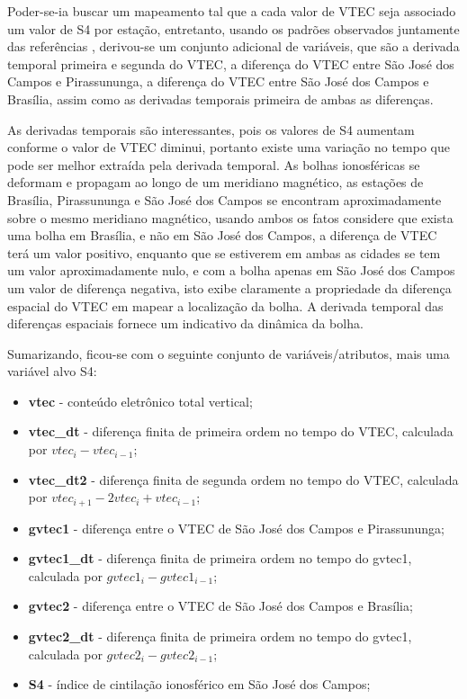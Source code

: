 Poder-se-ia buscar um mapeamento tal que a cada valor de VTEC seja associado um valor de S4 por estação, entretanto, usando os padrões observados juntamente das referências \cite{}, derivou-se um conjunto adicional de variáveis, que são a derivada temporal primeira e segunda do VTEC, a diferença do VTEC entre São José dos Campos e Pirassununga, a diferença do VTEC entre São José dos Campos e Brasília, assim como as derivadas temporais primeira de ambas as diferenças. 

As derivadas temporais são interessantes, pois os valores de S4 aumentam conforme o valor de VTEC diminui, portanto existe uma variação no tempo que pode ser melhor extraída pela derivada temporal. As bolhas ionosféricas se deformam e propagam ao longo de um meridiano magnético, as estações de Brasília, Pirassununga e São José dos Campos se encontram aproximadamente sobre o mesmo meridiano magnético, usando ambos os fatos considere que exista uma bolha em Brasília, e não em São José dos Campos, a diferença de VTEC terá um valor positivo, enquanto que se estiverem em ambas as cidades se tem um valor aproximadamente nulo, e com a bolha apenas em São José dos Campos um valor de diferença negativa, isto exibe claramente a propriedade da diferença espacial do VTEC em mapear a localização da bolha. A derivada temporal das diferenças espaciais fornece um indicativo da dinâmica da bolha.

Sumarizando, ficou-se com o seguinte conjunto de variáveis/atributos, mais uma variável alvo S4:

\begin{itemize}
\item {\bf vtec} - conteúdo eletrônico total vertical;
\item {\bf vtec\_dt} - diferença finita de primeira ordem no tempo do VTEC, calculada por $vtec_i-vtec_{i-1}$;
\item {\bf vtec\_dt2} - diferença finita de segunda ordem no tempo do VTEC, calculada por $vtec_{i+1}-2vtec_i+vtec_{i-1}$;
\item {\bf gvtec1} - diferença entre o VTEC de São José dos Campos e Pirassununga;
\item {\bf gvtec1\_dt} - diferença finita de primeira ordem no tempo do gvtec1, calculada por $gvtec1_i-gvtec1_{i-1}$;
\item {\bf gvtec2} - diferença entre o VTEC de São José dos Campos e Brasília;
\item {\bf gvtec2\_dt} - diferença finita de primeira ordem no tempo do gvtec1, calculada por $gvtec2_i-gvtec2_{i-1}$;
\item {\bf S4} - índice de cintilação ionosférico em São José dos Campos;
\end{itemize}


